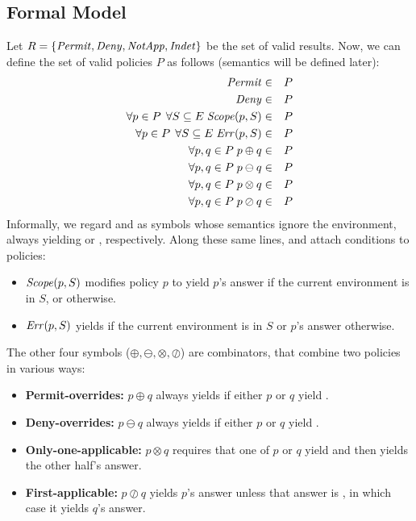 \subsection{Formal Model}
\label{sec:formal-model}

Let $R = \{ \text{\textit{Permit}}, \text{\textit{Deny}}, \text{\textit{NotApp}}, \text{\textit{Indet}} \}$ be the set
of valid results.  Now, we can define the set of valid policies $P$ as
follows (semantics will be defined later):
\begin{eqnarray*}
  \text{\textit{Permit}} & \in & P \\
  \text{\textit{Deny}} & \in & P \\
  \forall p \in P \;\, \forall S \subseteq E \; \text{\textit{Scope}} (p, S) & \in & P \\
  \forall p \in P \;\, \forall S \subseteq E \; \text{\textit{Err}} (p, S) & \in & P \\
  \forall p, q \in P \; p \oplus q & \in & P \\
  \forall p, q \in P \; p \ominus q & \in & P \\
  \forall p, q \in P \; p \otimes q & \in & P \\
  \forall p, q \in P \; p \oslash q & \in & P
\end{eqnarray*}
Informally, we regard \Permit{} and \Deny{} as symbols whose semantics
ignore the environment, always yielding \Permit{} or \Deny{},
respectively.  Along these same lines, \Scope{} and \Err{} attach
conditions to policies:
\begin{itemize}
\item $\text{\textit{Scope}} (p, S)$ modifies policy $p$ to yield $p$'s
answer if the current environment is in $S$, or \NotApplicable{}
otherwise.
\item $\text{\textit{Err}} (p, S)$ yields \Indeterminate{} if 
the current environment is in $S$ or $p$'s answer otherwise.  
\end{itemize}
The other four
symbols ($\oplus, \ominus, \otimes, \oslash$) are combinators, that
combine two policies in various ways:
\begin{itemize}
\item {\bf Permit-overrides:} $p \oplus q$ always yields
\Permit{} if either $p$ or $q$ yield \Permit{}.
\item  {\bf Deny-overrides:} $p \ominus q$ always
yields \Deny{} if either $p$ or $q$ yield \Deny{}.
\item  {\bf Only-one-applicable:} $p \otimes q$ requires that
one of $p$ or $q$ yield \NotApplicable{} and then yields the other
half's answer.
\item {\bf First-applicable:} $p \oslash q$ yields $p$'s answer unless
  that answer is \NotApplicable{}, in which case it yields $q$'s
  answer.
\end{itemize}

